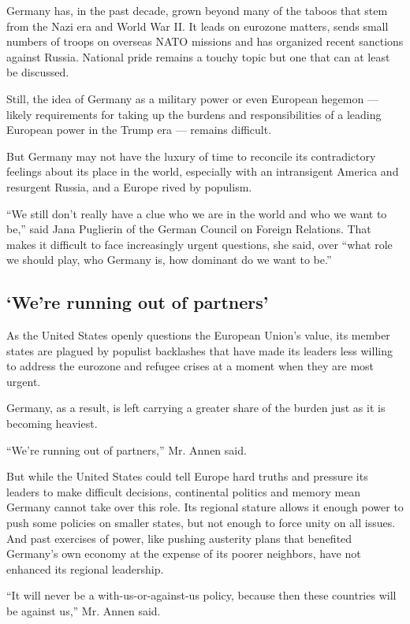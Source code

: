 Germany has, in the past decade, grown beyond many of the taboos that
stem from the Nazi era and World War II. It leads on eurozone matters,
sends small numbers of troops on overseas NATO missions and has
organized recent sanctions against Russia. National pride remains a
touchy topic but one that can at least be discussed.

Still, the idea of Germany as a military power or even European hegemon
--- likely requirements for taking up the burdens and responsibilities
of a leading European power in the Trump era --- remains difficult.

But Germany may not have the luxury of time to reconcile its
contradictory feelings about its place in the world, especially with an
intransigent America and resurgent Russia, and a Europe rived by
populism.

``We still don't really have a clue who we are in the world and who we
want to be,'' said Jana Puglierin of the German Council on Foreign
Relations. That makes it difficult to face increasingly urgent
questions, she said, over ``what role we should play, who Germany is,
how dominant do we want to be.''

\hypertarget{were-running-out-of-partners}{%
\subsection{`We're running out of
partners'}\label{were-running-out-of-partners}}

As the United States openly questions the European Union's value, its
member states are plagued by populist backlashes that have made its
leaders less willing to address the eurozone and refugee crises at a
moment when they are most urgent.

Germany, as a result, is left carrying a greater share of the burden
just as it is becoming heaviest.

``We're running out of partners,'' Mr. Annen said.

But while the United States could tell Europe hard truths and pressure
its leaders to make difficult decisions, continental politics and memory
mean Germany cannot take over this role. Its regional stature allows it
enough power to push some policies on smaller states, but not enough to
force unity on all issues. And past exercises of power, like pushing
austerity plans that benefited Germany's own economy at the expense of
its poorer neighbors, have not enhanced its regional leadership.

``It will never be a with-us-or-against-us policy, because then these
countries will be against us,'' Mr. Annen said.

